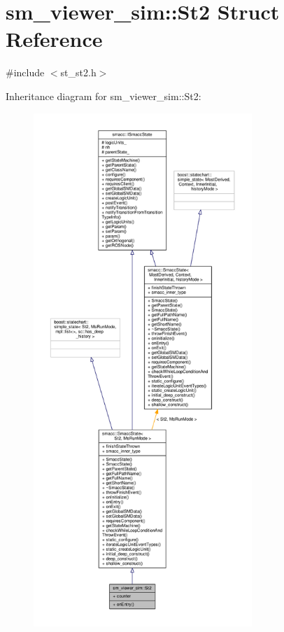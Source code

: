 \hypertarget{structsm__viewer__sim_1_1St2}{}\section{sm\+\_\+viewer\+\_\+sim\+:\+:St2 Struct Reference}
\label{structsm__viewer__sim_1_1St2}


{\ttfamily \#include $<$st\+\_\+st2.\+h$>$}



Inheritance diagram for sm\+\_\+viewer\+\_\+sim\+:\+:St2\+:\nopagebreak
\begin{figure}[H]
\begin{center}
\leavevmode
\includegraphics[height=550pt]{structsm__viewer__sim_1_1St2__inherit__graph}
\end{center}
\end{figure}


